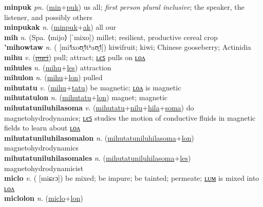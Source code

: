 \textbf{minpuk} \textit{pn.} (\hyperref[min]{min}+\hyperref[puk]{puk})
us all; \textit{first person plural inclusive}; the speaker, the listener, and possibly others \label{minpuk} \\
\textbf{minpukak} \textit{n.} (\hyperref[minpuk]{minpuk}+\hyperref[ak]{ak})
all our \label{minpukak} \\
\textbf{mih} \textit{n.} (Spa. ⟨mijo⟩ [ˈmixo])
millet; resilient, productive cereal crop \label{mih} \\
\textbf{'mihowtaw} \textit{n.} ( [mi˧˥xoʊ̯˧˥tʰaʊ̯˧˥])
kiwifruit; kiwi; Chinese gooseberry; Actinidia \label{'mihowtaw} \\
\textbf{mihu} \textit{v.} (\hyperref[puci]{\sout{puci}})
pull; attract; \hyperref[mihules]{ʟєꜱ} pulls on \hyperref[mihulon]{ʟᴏᴧ} \label{mihu} \\
\textbf{mihules} \textit{n.} (\hyperref[mihu]{mihu}+\hyperref[les]{les})
attraction \label{mihules} \\
\textbf{mihulon} \textit{n.} (\hyperref[mihu]{mihu}+\hyperref[lon]{lon})
pulled \label{mihulon} \\
\textbf{mihutatu} \textit{v.} (\hyperref[mihu]{mihu}+\hyperref[tatu]{tatu})
be magnetic; \hyperref[mihutatulon]{ʟᴏᴧ} is magnetic \label{mihutatu} \\
\textbf{mihutatulon} \textit{n.} (\hyperref[mihutatu]{mihutatu}+\hyperref[lon]{lon})
magnet; magnetic \label{mihutatulon} \\
\textbf{mihutatuniluhilasoma} \textit{v.} (\hyperref[mihutatu]{mihutatu}+\hyperref[nilu]{nilu}+\hyperref[hila]{hila}+\hyperref[soma]{soma})
do magnetohydrodynamics; \hyperref[mihutatuniluhilasomales]{ʟєꜱ} studies the motion of conductive fluids in magnetic fields to learn about \hyperref[mihutatuniluhilasomalon]{ʟᴏᴧ} \label{mihutatuniluhilasoma} \\
\textbf{mihutatuniluhilasomalon} \textit{n.} (\hyperref[mihutatuniluhilasoma]{mihutatuniluhilasoma}+\hyperref[lon]{lon})
magnetohydrodynamics \label{mihutatuniluhilasomalon} \\
\textbf{mihutatuniluhilasomales} \textit{n.} (\hyperref[mihutatuniluhilasoma]{mihutatuniluhilasoma}+\hyperref[les]{les})
magnetohydrodynamicist \label{mihutatuniluhilasomales} \\
\textbf{miclo} \textit{v.} ( [miɕrɔ])
be mixed; be impure; be tainted; permeate; \hyperref[miclolum]{ʟᴜᴍ} is mixed into \hyperref[miclolon]{ʟᴏᴧ} \label{miclo} \\
\textbf{miclolon} \textit{n.} (\hyperref[miclo]{miclo}+\hyperref[lon]{lon})

